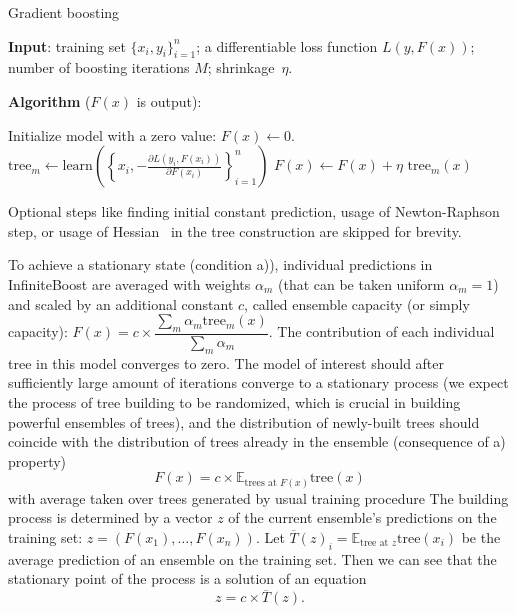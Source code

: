 \begin{algorithm}[!h]
  \caption{Gradient boosting}\label{alg:gb}
  {\bf Input}: training set $\{x_i, y_i\}_{i=1}^n$; a differentiable loss function $L(y, F(x))$; number of boosting iterations $M$; shrinkage~$\eta$.

  {\bf Algorithm} ($F(x)$ is output):
  \begin{algorithmic}
    \State Initialize model with a zero value: $F(x) \gets 0$.
      \State $\text{tree}_m \gets \text{learn}\left(\left\{x_i, -\frac{\partial L(y_i, F(x_i))}{\partial F(x_i)}\right\}_{i=1}^n\right)$
      \State $F(x) \gets F(x) + \eta \text{ tree}_m(x)$
    \EndFor
  \end{algorithmic}

  Optional steps like finding initial constant prediction, usage of Newton-Raphson step,
  or usage of Hessian~\cite{key-xgboost} in the tree construction are skipped for brevity.
\end{algorithm}

To achieve a stationary state (condition a)), individual predictions in InfiniteBoost are averaged with weights $\alpha_m$
(that can be taken uniform $\alpha_m = 1$)
and scaled by an additional constant $c$, called ensemble capacity (or simply capacity):
$ F(x) = c \times \dfrac{\sum_m \alpha_m \text{tree}_m(x)}{ \sum_m \alpha_m } $.
The contribution of each individual tree in this model converges to zero.
The model of interest should after sufficiently large amount of iterations converge to a stationary process
(we expect the process of tree building to be randomized, which is crucial in building powerful ensembles of trees),
and the distribution of newly-built trees should coincide with the distribution of trees already in the ensemble (consequence of a) property)
\begin{equation*}
  F(x) = c \times \mathbb{E}_{\text{trees at }F(x)} \text{tree}(x)
\end{equation*}
with average taken over trees generated by usual training procedure
The building process is determined by a vector $z$ of the current ensemble's predictions on the training set:
$ z = ( F(x_1), \dots, F(x_n) ) $.
Let $ \overline{T}(z)_i = \mathbb{E}_\text{tree at $z$} \text{tree}(x_i) $ be the average prediction of an ensemble on the training set. Then we can see that the stationary point of the process is a solution of an equation
\begin{equation}
    z = c \times \overline{T}(z) \label{eq:stationary}.
\end{equation}

